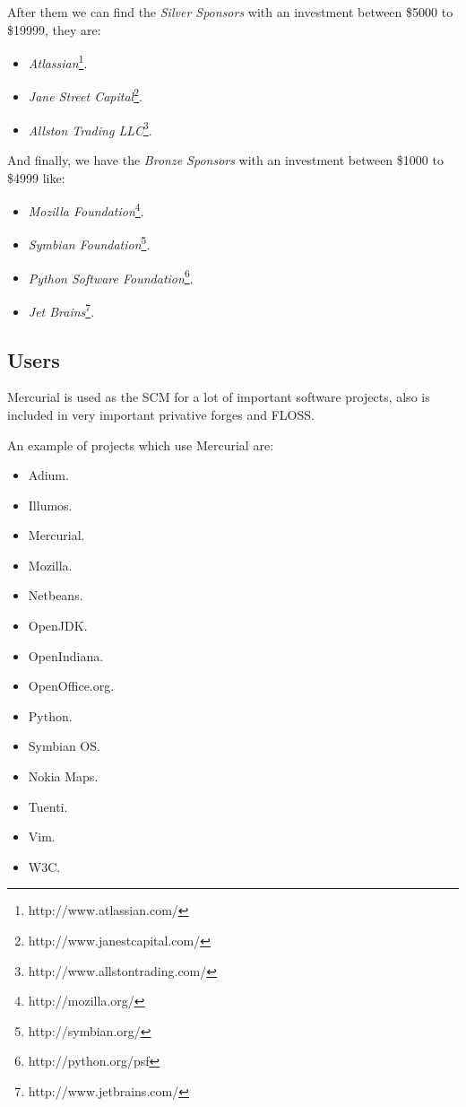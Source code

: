 \documentclass[a4paper,10pt]{article}
\begin{document}
After them we can find the \textit{Silver Sponsors} with an investment between
\$5000 to \$19999, they are:
\begin{itemize}
 \item \textit{Atlassian}\footnote{http://www.atlassian.com/}.
 \item \textit{Jane Street Capital}\footnote{http://www.janestcapital.com/}.
 \item \textit{Allston Trading LLC}\footnote{http://www.allstontrading.com/}.
\end{itemize}

And finally, we have the \textit{Bronze Sponsors} with an investment between
\$1000 to \$4999 like:
\begin{itemize}
 \item \textit{Mozilla Foundation}\footnote{http://mozilla.org/}.
 \item \textit{Symbian Foundation}\footnote{http://symbian.org/}.
 \item \textit{Python Software Foundation}\footnote{http://python.org/psf}.
 \item \textit{Jet Brains}\footnote{http://www.jetbrains.com/}.
\end{itemize}

\subsection{Users} \label{Users_mercurial}

Mercurial is used as the SCM for a lot of important software projects, also is
included in very important privative forges and FLOSS.

An example of projects which use Mercurial are:
\begin{itemize}
 \item Adium. 
 \item Illumos.
 \item Mercurial.
 \item Mozilla.
 \item Netbeans.
 \item OpenJDK.
 \item OpenIndiana.
 \item OpenOffice.org.
 \item Python.
 \item Symbian OS.
 \item Nokia Maps.
 \item Tuenti.
 \item Vim.
 \item W3C. 
\end{itemize}
\end{document}
